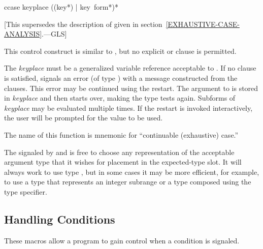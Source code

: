 \begin{defmac}
ccase keyplace {({({key}*) | key} {\,form}*)}*

   [This supersedes the description of 
   given in section~\ref{EXHAUSTIVE-CASE-ANALYSIS}.---GLS]

  This control construct is similar to , but no explicit  or
   clause is permitted.

  The {\it keyplace} must be a generalized variable reference acceptable to .
  If no clause is satisfied,  signals an error (of type )
  with a message constructed from the clauses. This error may be continued
  using the  restart. The argument to  is stored in
  {\it keyplace} and then  starts over, making the type tests again. Subforms
  of {\it keyplace} may be evaluated multiple times. If the  restart is
  invoked interactively, the user will be prompted for the value to be used.

  The name of this function is mnemonic for ``continuable (exhaustive) case.''

\beforenoterule
\begin{implementation}
  The  signaled by  and  is free to
  choose any representation of the acceptable argument type that it wishes
  for placement in the expected-type slot. It will always work to use type
  , but in some cases it may be more efficient, for example,
  to use a type that represents an integer subrange or a type composed using the
   type specifier.
\end{implementation}
\afternoterule
\end{defmac}


\subsection{Handling Conditions}

These macros allow a program to gain control when a condition is signaled.

